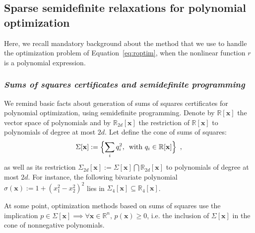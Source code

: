 \documentclass[preprint]{sigplanconf}
\newcommand{\R}{\mathbb{R}}
\newcommand{\x}{\mathbf{x}}
\theoremstyle{plain}
\begin{document}
\subsection{Sparse semidefinite relaxations for polynomial optimization}
\label{sec:sdpbackground}
Here, we recall mandatory background about the method that we use to handle the optimization problem of Equation~\eqref{eq:roptim}, when the nonlinear function $r$ is a polynomial expression.

\subsubsection*{\textit{Sums of squares certificates and semidefinite programming}}
We remind basic facts about generation of sums of squares certificates for polynomial optimization, using semidefinite programming.
Denote by $\R[\x]$ the vector space of polynomials and by $\R_{2 d}[\x]$ the restriction of $\R[\x]$ to polynomials of degree at most $2 d$. Let define the cone of sums of squares:
\begin{equation}
\label{eq:cone_sos}
\Sigma[\x] := \Bigl\{\sum_i q_i^2, \, \text{ with } q_i \in \R[\x] \Bigr\}\enspace,
\end{equation}
%
as well as its restriction $\Sigma_{2 d}[\x] := \Sigma[\x] \bigcap \R_{2 d}[\x]$ to polynomials of degree at most $2 d$. For instance, the following bivariate polynomial  $\sigma (\x) := 1 + (x_1^2 - x_2^2)^2$ lies in $\Sigma_4[\x] \subseteq \R_4[\x]$.

At some point, optimization methods based on sums of squares use the implication $p \in \Sigma[\x] \implies \forall \x \in \R^n, \, p(\x) \geq 0$, i.e. the inclusion of $\Sigma[\x]$ in the cone of nonnegative polynomials.
\end{document}
